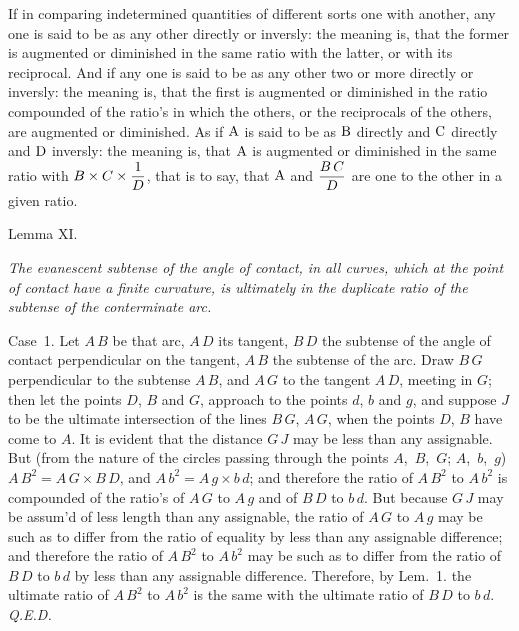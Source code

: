 If in comparing indetermined quantities of different sorts one
with another, any one is said to be as any other directly or
inversly: the meaning is, that the former is augmented or
diminished in the same ratio with the latter, or with its
reciprocal.  And if any one is said to be as any other two or
more directly or inversly: the meaning is, that the first is
augmented or diminished in the ratio compounded of the ratio's in
which the others, or the reciprocals of the others, are augmented
or diminished.  As if ${\rm A}$ is said to be as ${\rm B}$
directly and ${\rm C}$ directly and ${\rm D}$ inversly: the
meaning is, that ${\rm A}$ is augmented or diminished in the same
ratio with $\displaystyle B \times C \times {1 \over D}$, that is
to say, that ${\rm A}$ and
$\displaystyle {B \, C \over D}$
are one to the other in a given ratio.

\bigbreak

\centerline{\largesc Lemma XI.}

\nobreak\bigskip

{\it
The evanescent subtense of the angle of contact, in all curves,
which at the point of contact have a finite curvature, is
ultimately in the duplicate ratio of the subtense of the
conterminate arc.}

\midinsert
\centerline{}
\endinsert

\bigbreak

{\sc Case}~1.
Let $A \, B$ be that arc, $A \, D$ its tangent, $B \, D$ the
subtense of the angle of contact perpendicular on the tangent,
$A \, B$ the subtense of the arc.  Draw $B \, G$ perpendicular to
the subtense $A \, B$, and $A \, G$ to the tangent $A \, D$,
meeting in $G$; then let the points $D$, $B$
and $G$, approach to the points $d$, $b$ and
$g$, and suppose $J$ to be the ultimate intersection
of the lines $B \, G$, $A \, G$, when the points $D$,
$B$ have come to $A$.  It is evident that the
distance $G \, J$ may be less than any assignable.  But (from the
nature of the circles passing through the points $A$,~$B$,~$G$;
$A$,~$b$,~$g$)
$A \, B^2 = A \, G \times B \, D$,
and
$A \, b^2 = A \, g \times b \, d$;
and therefore the ratio of $A \, B^2$ to $A \, b^2$ is compounded
of the ratio's of $A \, G$ to $A \, g$ and of $B \, D$ to
$b \, d$.  But because $G \, J$ may be assum'd of less length
than any assignable, the ratio of $A \, G$ to $A \, g$ may be
such as to differ from the ratio of equality by less than any
assignable difference; and therefore the ratio of $A \, B^2$ to
$A \, b^2$ may be such as to differ from the ratio of $B \, D$ to
$b \, d$ by less than any assignable difference.  Therefore, by
Lem.~1. the ultimate ratio of $A \, B^2$ to $A \, b^2$ is the
same with the ultimate ratio of $B \, D$ to $b \, d$.
{\it Q.E.D.}

